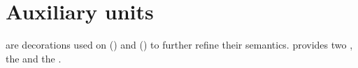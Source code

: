 
\section{Auxiliary units}\label{sec:aux}

 are decorations used on  () and  () to further refine their semantics.  \SBGNERLone{} provides two , the  and the .



